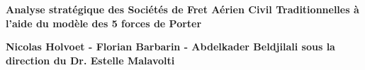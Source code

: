 
\begin{titlepage}
	\parindent=0pt
 
\addtolength{\wpXoffset}{-4.5cm}

	
	\hrulefill
	\begin{center}\bfseries\Huge
		\color{white}
		{Analyse stratégique des Sociétés de Fret Aérien Civil Traditionnelles à l'aide du modèle des 5 forces de Porter} 
	\end{center}
	\hrulefill
	
	\vspace*{1cm}
	\begin{center}\bfseries\Large
			\color{white}
		{Nicolas Holvoet - Florian Barbarin - Abdelkader Beldjilali sous la direction du Dr. Estelle Malavolti  }
		
	\end{center}
	


\end{titlepage}